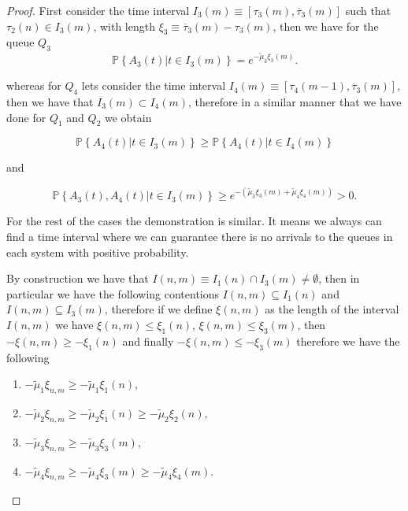 \documentclass{article}
\newcommand{\prob}{\mathbb{P}}
\begin{document}
\begin{proof}
First consider the time interval $I_{3}\left(m\right)\equiv\left[\tau_{3}\left(m\right),\overline{\tau}_{3}\left(m\right)\right]$ such that $\tau_{2}\left(n\right)\in I_{3}\left(m\right)$, with length $\xi_{3}\equiv\overline{\tau}_{3}\left(m\right)-\tau_{3}\left(m\right)$, then we have for the queue $Q_{3}$
\begin{equation}
\prob\left\{A_{3}\left(t\right)|t\in I_{3}\left(m\right)\right\}=e^{-\tilde{\mu}_{3}\xi_{3}\left(m\right)}.
\end{equation} 

whereas for $Q_{4}$ lets consider the time interval $I_{4}\left(m\right)\equiv\left[\tau_{4}\left(m-1\right),\overline{\tau}_{3}\left(m\right)\right]$, then we have that $I_{3}\left(m\right)\subset I_{4}\left(m\right)$, therefore in a similar manner that we have done for $Q_{1}$ and $Q_{2}$ we obtain


\begin{equation}
\prob\left\{A_{4}\left(t\right)|t\in I_{3}\left(m\right)\right\}\geq
\prob\left\{A_{4}\left(t\right)|t\in I_{4}\left(m\right)\right\}
\end{equation}

and

\begin{equation}
\prob\left\{A_{3}\left(t\right),A_{4}\left(t\right)|t\in I_{3}\left(m\right)\right\}\geq
e^{-\left(\tilde{\mu}_{3}\xi_{3}\left(m\right)+\tilde{\mu}_{4}\xi_{4}\left(m\right)\right)}>0.
\end{equation}


For the rest of the cases the demonstration is similar. It means we always can find a time interval where we can guarantee there is no arrivals to the queues in each system with positive probability.  


By construction we have that $I\left(n,m\right)\equiv I_{1}\left(n\right)\cap I_{3}\left(m\right)\neq\emptyset$, then in particular we have the following contentions $I\left(n,m\right)\subseteq I_{1}\left(n\right)$ and $I\left(n,m\right)\subseteq I_{3}\left(m\right)$, therefore if we define $\xi\left(n,m\right)$ as the length of the interval $I\left(n,m\right)$ we have $\xi\left(n,m\right)\leq\xi_{1}\left(n\right)$, $\xi\left(n,m\right)\leq\xi_{3}\left(m\right)$, then $-\xi\left(n,m\right)\geq-\xi_{1}\left(n\right)$ and finally $-\xi\left(n,m\right)\leq-\xi_{3}\left(m\right)$ therefore we have the following
\begin{multicols}{2}
\begin{enumerate}
\item $-\tilde{\mu}_{1}\xi_{n,m}\geq-\tilde{\mu}_{1}\xi_{1}\left(n\right)$,
\item $-\tilde{\mu}_{2}\xi_{n,m}\geq-\tilde{\mu}_{2}\xi_{1}\left(n\right)
\geq-\tilde{\mu}_{2}\xi_{2}\left(n\right)$,
\item $-\tilde{\mu}_{3}\xi_{n,m}\geq-\tilde{\mu}_{3}\xi_{3}\left(m\right)$,
\item $-\tilde{\mu}_{4}\xi_{n,m}\geq-\tilde{\mu}_{4}\xi_{3}\left(m\right)
\geq-\tilde{\mu}_{4}\xi_{4}\left(m\right).$
\end{enumerate}
\end{multicols}


\end{proof}
\end{document}
